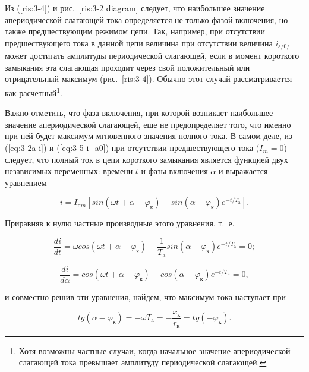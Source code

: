 Из (\ref{ris:3-4}) и рис.~\ref{ris:3-2 diagram} следует, что наибольшее значение апериодической слагающей тока определяется не только фазой включения, но также предшествующим режимом цепи. Так, например, при отсутствии предшествующего тока в данной цепи величина 
при отсутствии величина $ i_{\text{а}/0/} $ может достигать амплитуды периодической слагающей, если в момент короткого замыкания эта слагающая проходит через свой положительный или отрицательный максимум (рис.~\ref{ris:3-4}). Обычно этот случай рассматривается как расчетный\footnote{Хотя возможны частные случаи, когда начальное значение апериодической слагающей тока превышает амплитуду периодической слагающей.}.

Важно отметить, что фаза включения, при которой возникает наибольшее значение апериодической слагающей, еще не предопределяет того, что именно при ней будет максимум мгновенного значения полного тока. В самом деле, из (\ref{eq:3-2a i}) и (\ref{eq:3-5 i_a0}) при отсутствии предшествующего тока ($ I_m = 0 $) следует, что полный ток в цепи короткого замыкания является функцией двух независимых переменных: времени $ t $ и фазы включения $ \alpha $ и выражается уравнением

\begin{equation}
	i = I_{\text{п}m} [sin( \omega t + \alpha - \varphi_{\text{к}}) - sin(\alpha - \varphi_{\text{к}}) e^{-t/T_{\text{a}}} ].
	\label{eq:3-6 i}
\end{equation}

Приравняв к нулю частные производные этого уравнения, т.~е.

\begin{equation*}
	\frac{di}{dt} = \omega cos( \omega t + \alpha - \varphi_{\text{к}} ) + \frac{1}{T_{\text{a}}} sin( \alpha - \varphi_{\text{к}} ) e^{-t/T_{\text{a}}} = 0;
\end{equation*}

\begin{equation*}
	\frac{di}{d \alpha} = cos( \omega t + \alpha - \varphi_{\text{к}} ) - cos( \alpha - \varphi_{\text{к}} ) e^{-t/T_{\text{a}}} = 0,
\end{equation*}

и совместно решив эти уравнения, найдем, что максимум тока наступает при

\begin{equation*}
	tg( \alpha - \varphi_{\text{к}} ) = -\omega T_{\text{a}} = - \frac{x_{\text{к}}}{r_{\text{к}}} = tg( -\varphi_{\text{к}}).
\end{equation*}

